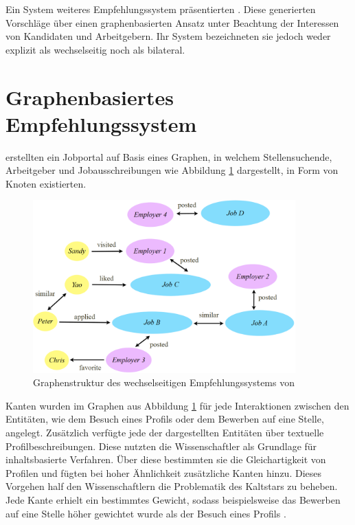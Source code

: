 Ein System weiteres Empfehlungssystem präsentierten \textcite[S. 1ff.]{lu:2013}. Diese generierten Vorschläge über einen graphenbasierten Ansatz unter Beachtung der Interessen von Kandidaten und Arbeitgebern. Ihr System bezeichneten sie jedoch weder explizit als wechselseitig noch als bilateral.

\section{Graphenbasiertes Empfehlungssystem}
\label{ch:verwandteArbeiten:nichtAufDemPEFitBasierendeBilateraleSysteme:lu:2013}
\textcite[S. 1ff.]{lu:2013} erstellten ein Jobportal auf Basis eines Graphen, in welchem Stellensuchende, Arbeitgeber und Jobausschreibungen wie Abbildung \ref{fig:verwandteArbeiten:nichtAufDemPEFitBasierendeBilateraleSysteme:lu:2013:abb1} dargestellt, in Form von Knoten existierten.

\begin{figure}[h]
	\centering
	\includegraphics[width=0.9\textwidth]{gfx/lu-graph.png}
	\caption{Graphenstruktur des wechselseitigen Empfehlungssystems von \textcite[S. 2]{lu:2013}}
	\label{fig:verwandteArbeiten:nichtAufDemPEFitBasierendeBilateraleSysteme:lu:2013:abb1}
\end{figure}

Kanten wurden im Graphen aus Abbildung \ref{fig:verwandteArbeiten:nichtAufDemPEFitBasierendeBilateraleSysteme:lu:2013:abb1} für jede Interaktionen zwischen den Entitäten, wie dem Besuch eines Profils oder dem Bewerben auf eine Stelle, angelegt. Zusätzlich verfügte jede der dargestellten Entitäten über textuelle Profilbeschreibungen. Diese nutzten die Wissenschaftler als Grundlage für inhaltsbasierte Verfahren. Über diese bestimmten sie die Gleichartigkeit von Profilen und fügten bei hoher Ähnlichkeit zusätzliche Kanten hinzu. Dieses Vorgehen half den Wissenschaftlern die Problematik des Kaltstars zu beheben. Jede Kante erhielt ein bestimmtes Gewicht, sodass beispielsweise das Bewerben auf eine Stelle höher gewichtet wurde als der Besuch eines Profils \cite[S. 1ff.]{lu:2013}.

